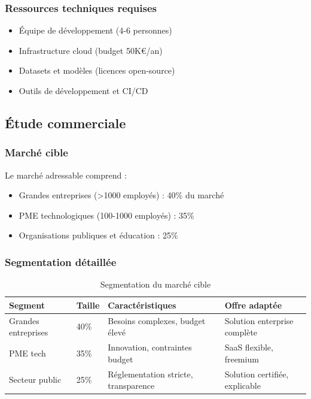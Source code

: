 \documentclass[12pt,a4paper]{report}
\begin{document}
\subsubsection{Ressources techniques requises}

\begin{itemize}
\item Équipe de développement (4-6 personnes)
\item Infrastructure cloud (budget 50K€/an)
\item Datasets et modèles (licences open-source)
\item Outils de développement et CI/CD
\end{itemize}

\subsection{Étude commerciale}

\subsubsection{Marché cible}

Le marché adressable comprend :
\begin{itemize}
\item Grandes entreprises (>1000 employés) : 40\% du marché
\item PME technologiques (100-1000 employés) : 35\%
\item Organisations publiques et éducation : 25\%
\end{itemize}

\subsubsection{Segmentation détaillée}

\begin{table}[H]
\centering
\caption{Segmentation du marché cible}
\label{tab:segmentation}
\begin{tabular}{@{}llll@{}}
\toprule
Segment & Taille & Caractéristiques & Offre adaptée \\
\midrule
Grandes entreprises & 40\% & Besoins complexes, budget élevé & Solution enterprise complète \\
PME tech & 35\% & Innovation, contraintes budget & SaaS flexible, freemium \\
Secteur public & 25\% & Réglementation stricte, transparence & Solution certifiée, explicable \\
\bottomrule
\end{tabular}
\end{table}
\end{document}
